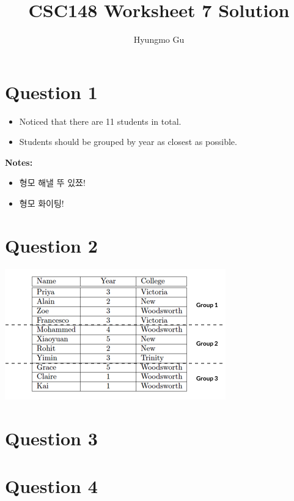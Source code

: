 \documentclass[12pt]{article}
\begin{document}
\title{CSC148 Worksheet 7 Solution}
\author{Hyungmo Gu}
\maketitle

\section*{Question 1}

\begin{itemize}
    \item Noticed that there are 11 students in total.
    \item Students should be grouped by year as closest as possible.
\end{itemize}

\bigskip

\textbf{Notes:}

\begin{itemize}
    \item 형모 해낼 뚜 있쬬!
    \item 형모 화이팅!
\end{itemize}

\section*{Question 2}
\begin{center}
\includegraphics[width=0.7\linewidth]{images/worksheet_7_q2_solution.png}
\end{center}

\section*{Question 3}

\section*{Question 4}
\end{document}
